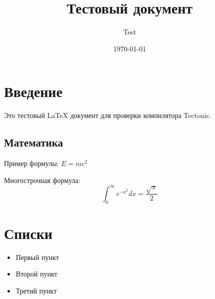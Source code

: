 \documentclass{article}
\title{Тестовый документ}
\author{Test}
\date{\today}
\begin{document}
\maketitle

\section{Введение}

Это тестовый LaTeX документ для проверки компилятора Tectonic.

\subsection{Математика}

Пример формулы: $E = mc^2$

Многострочная формула:
\begin{equation}
    \int_{0}^{\infty} e^{-x^2} dx = \frac{\sqrt{\pi}}{2}
\end{equation}

\section{Списки}

\begin{itemize}
    \item Первый пункт
    \item Второй пункт
    \item Третий пункт
\end{itemize}
\end{document}
